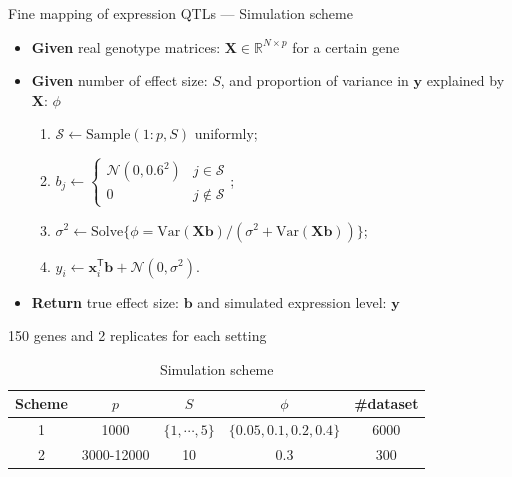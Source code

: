 \documentclass[10pt]{beamer}
\begin{document}
\begin{frame}{Fine mapping of expression QTLs --- \normalsize Simulation scheme}
    \begin{itemize}
        \item \textbf{Given} real genotype matrices: $\bm{X}\in\mathbb{R}^{N\times p}$ for a certain gene
        \item \textbf{Given} number of effect size: $S$, and proportion of variance in $\bm{y}$ explained by $\bm{X}$: $\phi$
        \begin{enumerate}
            \item $\mathcal{S}\gets\text{Sample}(1:p, S)$ uniformly;
            \item $b_j\gets\begin{cases}
                \mathcal{N}(0,0.6^2) & j \in \mathcal{S} \\
                0 & j \notin \mathcal{S}
            \end{cases}$;
            \item $\sigma^2\gets \text{Solve}\{\phi=\text{Var}(\bm{Xb})/(\sigma^2 + \text{Var}(\bm{Xb}))\}$;
            \item $y_i\gets \bm{x}_i^\mathsf{T}\bm{b} + \mathcal{N}(0,\sigma^2)$.
        \end{enumerate}
        \item \textbf{Return} true effect size: $\bm{b}$ and simulated expression level: $\bm{y}$
    \end{itemize}
    
    \medskip

    \begin{table}[H]
        \centering
        \caption{Simulation scheme}
        150 genes and 2 replicates for each setting
        \label{tab:simusche}
        \begin{tabular}{ccccc}
        \toprule
            Scheme & $p$ & $S$ & $\phi$ & \#dataset \\
            \midrule
            1 & 1000 & $\{1,\cdots,5\}$ & $\{0.05,0.1,0.2,0.4\}$ & 6000 \\
            2 & 3000-12000 & 10 & 0.3 & 300 \\
            \bottomrule
        \end{tabular}
    \end{table}
\end{frame}




\end{document}
